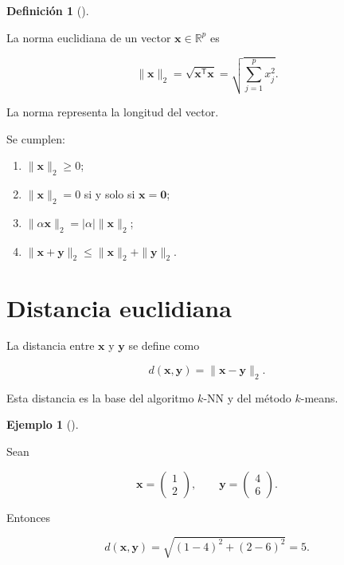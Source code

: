 \documentclass[
  spanish,
  10.5pt,
  letterpaper,
  DIV=11,
  numbers=noendperiod,
  oneside,
  open=any]{scrreprt}
\providecommand{\tightlist}{%
  \setlength{\itemsep}{0pt}\setlength{\parskip}{0pt}}
\theoremstyle{definition}
\newtheorem{definition}{Definición}[chapter]
\theoremstyle{definition}
\newtheorem{example}{Ejemplo}[chapter]
\theoremstyle{plain}
\theoremstyle{remark}
\begin{document}

\begin{definition}[]\protect\hypertarget{def-norma-euclidiana}{}\label{def-norma-euclidiana}

La norma euclidiana de un vector \(\mathbf{x}\in\mathbb{R}^{p}\) es

\[
\|\mathbf{x}\|_2
=
\sqrt{
\mathbf{x}^{\mathsf T}\mathbf{x}
}
=
\sqrt{
\sum_{j=1}^{p}x_j^2
}.
\]

\end{definition}

La norma representa la longitud del vector.

Se cumplen:

\begin{enumerate}
\def\labelenumi{\arabic{enumi}.}
\tightlist
\item
  \(\|\mathbf{x}\|_2\geq 0\);
\item
  \(\|\mathbf{x}\|_2=0\) si y solo si \(\mathbf{x}=\mathbf{0}\);
\item
  \(\|\alpha\mathbf{x}\|_2=|\alpha|\|\mathbf{x}\|_2\);
\item
  \(\|\mathbf{x}+\mathbf{y}\|_2\leq\|\mathbf{x}\|_2+\|\mathbf{y}\|_2\).
\end{enumerate}

\section*{Distancia euclidiana}\label{distancia-euclidiana}


La distancia entre \(\mathbf{x}\) y \(\mathbf{y}\) se define como

\[
d(\mathbf{x},\mathbf{y})
=
\|\mathbf{x}-\mathbf{y}\|_2.
\]

Esta distancia es la base del algoritmo \(k\)-NN y del método
\(k\)-means.

\begin{example}[]\protect\hypertarget{exm-distancia}{}\label{exm-distancia}

Sean

\[
\mathbf{x}
=
\begin{pmatrix}
1\\
2
\end{pmatrix},
\qquad
\mathbf{y}
=
\begin{pmatrix}
4\\
6
\end{pmatrix}.
\]

Entonces

\[
d(\mathbf{x},\mathbf{y})
=
\sqrt{(1-4)^2+(2-6)^2}
=
5.
\]

\end{example}
\end{document}

